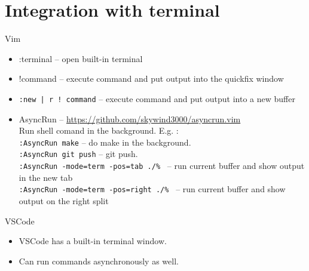 \documentclass[aspectratio=169]{beamer}
\newcommand{\myurl}[1]{{\color{indigo}\url{#1}}}%
\begin{document}
\section*{Integration with terminal}
\begin{frame}[fragile]{\secname}
  \begin{block}{Vim}
    \begin{itemize}
      \item :terminal -- open built-in terminal
      \item !command  -- execute command and put output into the quickfix window
      \item \lstinline{:new | r ! command} -- execute command and put output into a new buffer
      \item AsyncRun -- {\color{blue} \myurl{https://github.com/skywind3000/asyncrun.vim}} \\
        Run shell comand in the background.  E.g. : \\
        \lstinline{:AsyncRun make} -- do make in the background. \\
        \lstinline{:AsyncRun git push} -- git push.\\
        \lstinline{:AsyncRun -mode=term -pos=tab ./% } -- run current buffer and show output in the new tab\\
     \lstinline{:AsyncRun -mode=term -pos=right ./% } -- run current buffer and show output on the right split\\
    \end{itemize}
  \end{block}	
  \begin{block}{VSCode}
    \begin{itemize}
      \item VSCode has a built-in terminal window.
      \item Can run commands asynchronously as well.
    \end{itemize}
    
  \end{block}
\end{frame}

\end{document}
